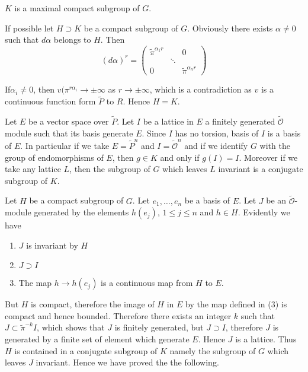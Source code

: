 \setcounter{corollary}{0}
\begin{corollary}\label{part2:chap2:sec2:coro1}
  $K$ is a maximal compact subgroup of $G$. 
\end{corollary}

If possible let $H \supset K$ be a compact subgroup of $G$. Obviously
there exists $\alpha \neq 0$ such that $d {\alpha}$ belongs to
$H$. Then  
\begin{equation*}
  (d {\alpha})^r= 
  \begin{pmatrix}
    \widetilde{\pi}^{\alpha_1 {r}}& &  0\\
      & \ddots &\\
    0 & & \widetilde{\pi}^{\alpha_nr}
  \end{pmatrix} 
\end{equation*}

If\pageoriginale $\alpha_i \neq 0$, then $v(\pi^{r \alpha_i} \to \pm \infty$ as $r \to
\pm \infty$, which is a contradiction as $v$ is a continuous function
form $\widetilde{P}$ to $R$. Hence $H = K$. 

Let $E$ be a vector space over $\widetilde{P}$. Let $I$ be a lattice
in $E$ \iec  a finitely generated $\tilde{\mathscr{O}}$ module such that its
basis generate $E$. Since $I$ has no torsion, basis of $I$ is a basis
of $E$. In particular if we take $E=\widetilde{P}^n$ and
$I=\widetilde{\mathscr{O}}^n$ and if we identify $G$ with the group of
endomorphisms of $E$, then $g \in K$ and only if $g(I)=I$. Moreover if
we take any lattice $L$, then the subgroup of $G$ which leaves $L$
invariant is a conjugate subgroup of $K$. 

Let $H$ be a compact subgroup of $G$. Let $e_1, \ldots, e_n$ be a basis
of $E$. Let $J$ be an $\tilde{\mathscr{O}}$-module generated by the elements
$h(e_j)$, $1 \leq j \leq n$ and $h \in H$. Evidently we have  
\begin{enumerate}[(1)]
\item $J$ is invariant by $H$
\item $J \supset I$
\item The map $h\to h(e_j)$ is a continuous map from $H$ to $E$.
\end{enumerate}
But $H$ is compact, therefore the image of $H$ in $E$ by the map defined
in (3) is compact and hence bounded. Therefore there exists an integer
$k$ such that $J\subset \widetilde{\pi}^{-k} I$, which shows that $J$
is finitely generated, but $J \supset I$, therefore $J$ is 
generated by a finite set of element which generate $E$. Hence $J$ is a 
lattice. Thus $H$ is contained in a conjugate subgroup of $K$ namely
the subgroup of $G$ which leaves $J$ invariant. Hence we have proved
the the following. 

